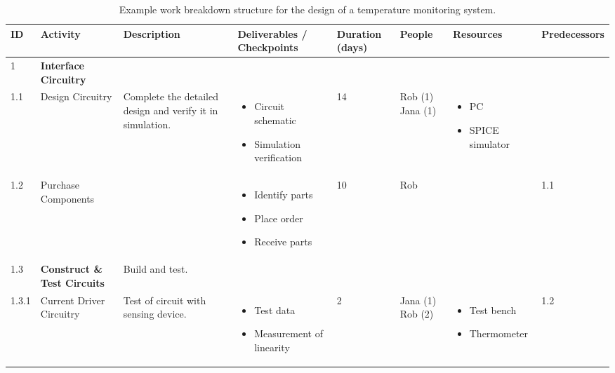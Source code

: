 \begin{table}
\caption{Example work breakdown structure for the design of a
temperature monitoring system.}
\label{table:workBreakDownStructureExample}
\begin{tabular}{|m{1cm}|m{1.5cm}|m{2cm}|m{2cm}|m{1cm}|m{1cm}|m{2.5cm}|m{1cm}|   }
\hline
\textbf{ID} & \textbf{Activity} & \textbf{Description} & \textbf{Deliverables / Checkpoints} & \textbf{Duration (days)} & \textbf{People} & \textbf{Resources} & \textbf{Predecessors} \\ \hline

1 & \textbf{Interface Circuitry} & & & & & & \\
1.1 & Design Circuitry & Complete the detailed design and verify it in simulation. & 
	\begin{itemize} 	\item Circuit schematic 	\item Simulation verification 	\end{itemize}
	& 14 & Rob (1) Jana (1) & 
	\begin{itemize} \item PC \item SPICE simulator \end{itemize} & \\ \hline

1.2 & Purchase Components & & 
	\begin{itemize} \item Identify parts \item Place order \item Receive parts \end{itemize}
	& 10 & Rob & & 1.1 \\ \hline

1.3 &  \textbf{Construct \& Test Circuits} & Build and test. & & & & & \\ \hline

1.3.1 & Current Driver Circuitry & Test of circuit with sensing device. & 
	\begin{itemize} \item Test data  \item Measurement of linearity \end{itemize}
	& 2 & Jana (1) Rob (2) & 
	\begin{itemize} \item Test bench \item Thermometer \end{itemize} & 1.2 \\ \hline


\end{tabular}
\end{table}
